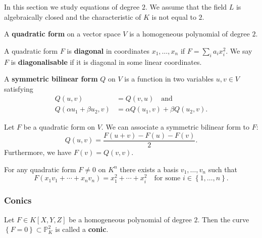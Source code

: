 \documentclass[12pt, a4paper]{article}
\newcommand{\PP}{\mathbb P}
\begin{document}
\begin{mdnote}
    In this section we study equations of degree \(2\). We assume that the field \(L\) is algebraically closed and the characteristic of \(K\) is not equal to \(2\).
\end{mdnote}

\begin{definition}
    A \textbf{quadratic form} on a vector space \(V\) is a homogeneous polynomial of degree \(2\).
\end{definition}

\begin{definition}
    A quadratic form \(F\) is \textbf{diagonal} in coordinates \(x_1,\ldots,x_n\) if \(F = \sum_i a_i x_i^2\). We say \(F\) is \textbf{diagonalisable} if it is diagonal in some linear coordinates.
\end{definition}

\begin{definition}
    A \textbf{symmetric bilinear form} \(Q\) on \(V\) is a function in two variables \(u,v \in V\) satisfying 
    \[\begin{aligned}
        Q(u,v) &=Q(v,u) \quad \text{and} \\
        Q(\alpha u_1+\beta u_2,v) &= \alpha Q(u_1,v) +\beta Q(u_2,v).
    \end{aligned}\]
\end{definition}

\begin{mdthm}
    Let \(F\) be a quadratic form on \(V\). We can associate a symmetric bilinear form to \(F\):
    \[Q(u,v) = \frac{F(u+v)-F(u)-F(v)}{2}.\]
    Furthermore, we have \(F(v)=Q(v,v)\).
\end{mdthm}

\begin{mdlemma}
    For any quadratic form \(F \neq 0\) on \(K^n\) there exists a basis \(v_1,\ldots,v_n\) such that 
    \[F(x_1v_1+\cdots+x_n v_n)=x_1^2+\cdots+x_i^2 \quad \text{for some } i\in\left\{ 1,\ldots,n \right\}.\]
\end{mdlemma}

\subsubsection{Conics}

\begin{definition}
    Let \(F \in K[X,Y,Z]\) be a homogeneous polynomial of degree \(2\). Then the curve \(\left\{ F=0 \right\} \subset \PP^2_K\) is called a \textbf{conic}. 
\end{definition}
\end{document}

